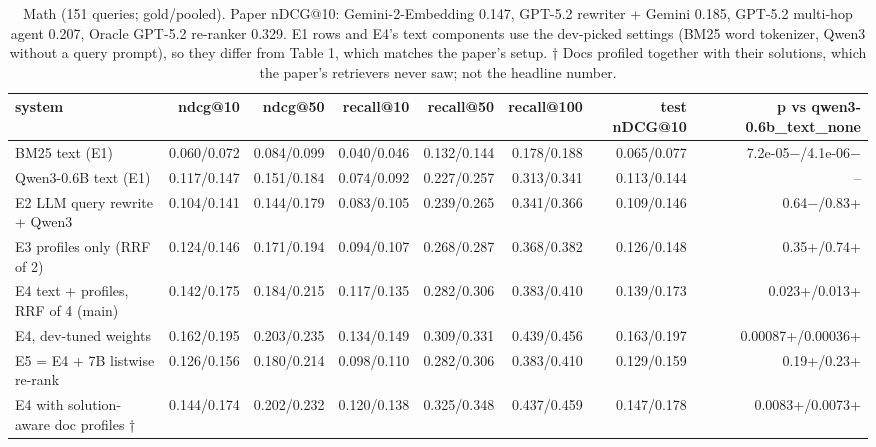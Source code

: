 \begin{table}[t]
\centering\small
\caption{Math (151 queries; gold/pooled). Paper nDCG@10: Gemini-2-Embedding 0.147, GPT-5.2 rewriter + Gemini 0.185, GPT-5.2 multi-hop agent 0.207, Oracle GPT-5.2 re-ranker 0.329. E1 rows and E4's text components use the dev-picked settings (BM25 word tokenizer, Qwen3 without a query prompt), so they differ from Table 1, which matches the paper's setup. † Docs profiled together with their solutions, which the paper's retrievers never saw; not the headline number.}
\label{tab:math}
\begin{tabular}{lrrrrrrr}
\toprule
system & ndcg@10 & ndcg@50 & recall@10 & recall@50 & recall@100 & test nDCG@10 & p vs qwen3-0.6b\_text\_none \\
\midrule
BM25 text (E1) & 0.060/0.072 & 0.084/0.099 & 0.040/0.046 & 0.132/0.144 & 0.178/0.188 & 0.065/0.077 & 7.2e-05$-$/4.1e-06$-$ \\
Qwen3-0.6B text (E1) & 0.117/0.147 & 0.151/0.184 & 0.074/0.092 & 0.227/0.257 & 0.313/0.341 & 0.113/0.144 & – \\
E2 LLM query rewrite + Qwen3 & 0.104/0.141 & 0.144/0.179 & 0.083/0.105 & 0.239/0.265 & 0.341/0.366 & 0.109/0.146 & 0.64$-$/0.83+ \\
E3 profiles only (RRF of 2) & 0.124/0.146 & 0.171/0.194 & 0.094/0.107 & 0.268/0.287 & 0.368/0.382 & 0.126/0.148 & 0.35+/0.74+ \\
E4 text + profiles, RRF of 4 (main) & 0.142/0.175 & 0.184/0.215 & 0.117/0.135 & 0.282/0.306 & 0.383/0.410 & 0.139/0.173 & 0.023+/0.013+ \\
E4, dev-tuned weights & 0.162/0.195 & 0.203/0.235 & 0.134/0.149 & 0.309/0.331 & 0.439/0.456 & 0.163/0.197 & 0.00087+/0.00036+ \\
E5 = E4 + 7B listwise re-rank & 0.126/0.156 & 0.180/0.214 & 0.098/0.110 & 0.282/0.306 & 0.383/0.410 & 0.129/0.159 & 0.19+/0.23+ \\
E4 with solution-aware doc profiles † & 0.144/0.174 & 0.202/0.232 & 0.120/0.138 & 0.325/0.348 & 0.437/0.459 & 0.147/0.178 & 0.0083+/0.0073+ \\
\bottomrule
\end{tabular}
\end{table}

